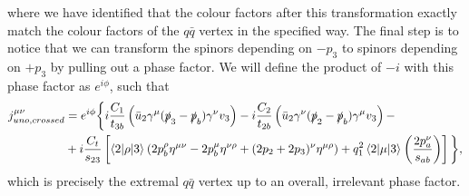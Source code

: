 where we have identified that the colour factors after this transformation exactly match the colour factors of the $q\bar{q}$ vertex in the specified way. The final step is to notice that we can transform the spinors depending on $-p_3$ to spinors depending on $+p_3$ by pulling out a phase factor. We will define the product of $-i$ with this phase factor as $e^{i \phi}$, such that
\begin{equation}
\begin{split}
j_{uno, crossed}^{\mu \nu} &= e^{i\phi} \bigg \{ i \frac{C_1}{t_{3b}} \left(\bar{u}_2 \gamma^\mu (\slashed{p}_3 - \slashed{p}_b)\gamma^\nu v_3 \right) - i \frac{C_2}{t_{2b}} \left(\bar{u}_2 \gamma^\nu (\slashed{p}_2 - \slashed{p}_b) \gamma^\mu v_3 \right) -  \\
& +i \frac{C_t}{s_{23}} \left[\mathinner{\langle2\vert\rho\vert3\rangle}_{} \left(2p_b^\rho \eta^{\mu \nu} - 2 p_b^\mu \eta^{\nu \rho} + (2p_2 + 2p_3)^\nu \eta^{\mu \rho} \right) + q_1^2 \mathinner{\langle2\vert\mu\vert3\rangle}_{} \left(\frac{2p_a^\nu}{s_{ab}} \right) \right] \bigg \},
\end{split}
\end{equation}
which is precisely the extremal $q\bar{q}$ vertex up to an overall, irrelevant phase factor. 